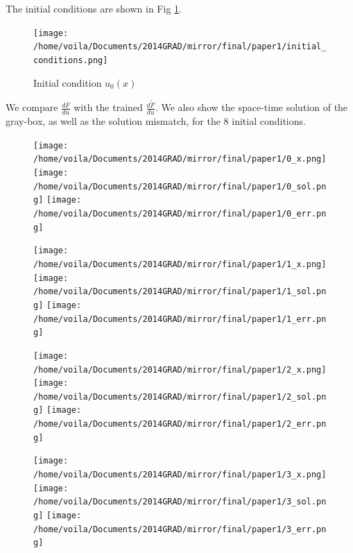 \documentclass[a4paper,onecolumn]{article}
\theoremstyle{remark}
\begin{document}
\noindent The initial conditions are shown in Fig \ref{fig:initial condition}.
\begin{figure}[H]\begin{center}
    \texttt{[image: /home/voila/Documents/2014GRAD/mirror/final/paper1/initial\_conditions.png]}
    \caption{Initial condition $u_0(x)$}
    \label{fig:initial condition}
\end{center}\end{figure}
\noindent We compare $\frac{dF}{du}$ with the trained $\frac{d\tilde{F}}{du}$. We also show the
space-time solution of the gray-box, as well as the solution mismatch, for the 8 initial conditions.
\begin{figure}[H]\begin{center}
    \texttt{[image: /home/voila/Documents/2014GRAD/mirror/final/paper1/0\_x.png]}
    \texttt{[image: /home/voila/Documents/2014GRAD/mirror/final/paper1/0\_sol.png]}
    \texttt{[image: /home/voila/Documents/2014GRAD/mirror/final/paper1/0\_err.png]}
    \label{fig:sol compare}
\end{center}\end{figure}
\vspace{-1cm}
\begin{figure}[H]\begin{center}
    \texttt{[image: /home/voila/Documents/2014GRAD/mirror/final/paper1/1\_x.png]}
    \texttt{[image: /home/voila/Documents/2014GRAD/mirror/final/paper1/1\_sol.png]}
    \texttt{[image: /home/voila/Documents/2014GRAD/mirror/final/paper1/1\_err.png]}
    \label{fig:sol compare}
\end{center}\end{figure}
\vspace{-1cm}
\begin{figure}[H]\begin{center}
    \texttt{[image: /home/voila/Documents/2014GRAD/mirror/final/paper1/2\_x.png]}
    \texttt{[image: /home/voila/Documents/2014GRAD/mirror/final/paper1/2\_sol.png]}
    \texttt{[image: /home/voila/Documents/2014GRAD/mirror/final/paper1/2\_err.png]}
    \label{fig:sol compare}
\end{center}\end{figure}
\vspace{-1cm}
\begin{figure}[H]\begin{center}
    \texttt{[image: /home/voila/Documents/2014GRAD/mirror/final/paper1/3\_x.png]}
    \texttt{[image: /home/voila/Documents/2014GRAD/mirror/final/paper1/3\_sol.png]}
    \texttt{[image: /home/voila/Documents/2014GRAD/mirror/final/paper1/3\_err.png]}
    \label{fig:sol compare}
\end{center}\end{figure}
\end{document}
